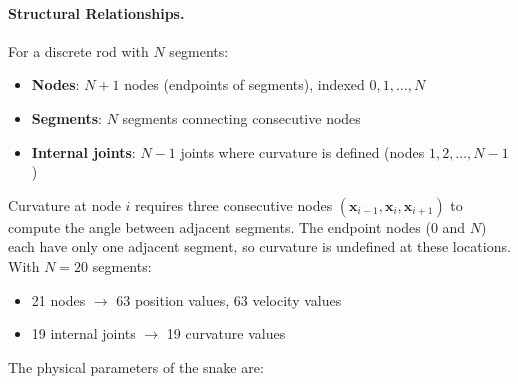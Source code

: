 \documentclass[11pt]{article}
\begin{document}
\begin{center}
\end{center}

\paragraph{Structural Relationships.}
For a discrete rod with $N$ segments:
\begin{itemize}
    \item \textbf{Nodes}: $N + 1$ nodes (endpoints of segments), indexed $0, 1, \ldots, N$
    \item \textbf{Segments}: $N$ segments connecting consecutive nodes
    \item \textbf{Internal joints}: $N - 1$ joints where curvature is defined (nodes $1, 2, \ldots, N-1$)
\end{itemize}

Curvature at node $i$ requires three consecutive nodes $(\mathbf{x}_{i-1}, \mathbf{x}_i, \mathbf{x}_{i+1})$ to compute the angle between adjacent segments. The endpoint nodes (0 and $N$) each have only one adjacent segment, so curvature is undefined at these locations. With $N = 20$ segments:
\begin{itemize}
    \item 21 nodes $\rightarrow$ 63 position values, 63 velocity values
    \item 19 internal joints $\rightarrow$ 19 curvature values
\end{itemize}

The physical parameters of the snake are:
\end{document}
